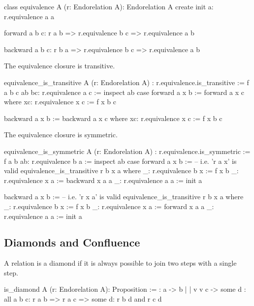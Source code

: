\begin{alba}
  class
    equivalence A (r: Endorelation A): Endorelation A
  create
    init a:
     r.equivalence a a

    forward a b c:
      r a b => r.equivalence b c => r.equivalence a b

    backward a b c:
      r b a => r.equivalence b c => r.equivalence a b
\end{alba}


The equivalence closure is transitive.

\begin{alba}
  equivalence_is_transitive
    A (r: Endorelation A)
    : r.equivalence.is_transitive :=
    f a b c ab bc: r.equivalence a c :=
      inspect ab case
        forward a x b :=
          forward a x c where
            xc: r.equivalence x c := f x b c

        backward a x b :=
          backward a x c where
            xc: r.equivalence x c := f x b c
\end{alba}

The equivalence closure is symmetric.

\begin{alba}
  equivalence_is_symmetric
    A (r: Endorelation A)
    : r.equivalence.is_symmetric :=
    f a b ab: r.equivalence b a :=
      inspect ab case
        forward a x b :=   -- i.e. 'r a x' is valid
          equivalence_is_transitive r b x a where
            _: r.equivalence b x := f x b
            _: r.equivalence x a := backward x a a
            _: r.equivalence a a := init a

        backward a x b :=  -- i.e. 'r x a' is valid
          equivalence_is_transitive r b x a where
            _: r.equivalence b x := f x b
            _: r.equivalence x a := forward x a a
            _: r.equivalence a a := init a
\end{alba}






\subsection{Diamonds and Confluence}


A relation is a diamond if it is always possible to join two steps with a
single step.

\begin{alba}
  is_diamond A (r: Endorelation A): Proposition :=
      {:   a  ->  b
           |      |
           v      v
           c  -> some d :}
    all a b c:
      r a b
      => r a c
      => some d: r b d and r c d
\end{alba}


